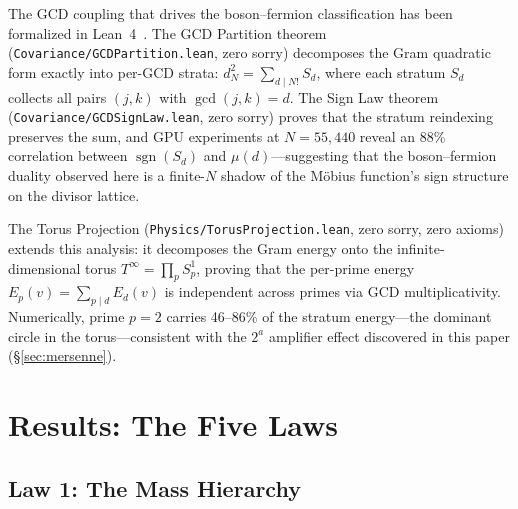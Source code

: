 \documentclass[11pt,a4paper]{article}
\begin{document}
\begin{remark}
The GCD coupling that drives the boson--fermion classification has been
formalized in Lean~4~\cite{cathedral-physics}. The GCD Partition theorem
(\texttt{Covariance/GCDPartition.lean}, zero sorry) decomposes the
Gram quadratic form exactly into per-GCD strata:
$d_N^2 = \sum_{d \mid N!} S_d$,
where each stratum $S_d$ collects all pairs $(j,k)$ with $\gcd(j,k) = d$.
The Sign Law theorem (\texttt{Covariance/GCDSignLaw.lean}, zero sorry)
proves that the stratum reindexing preserves the sum, and GPU experiments
at $N = 55{,}440$ reveal an 88\% correlation between
$\operatorname{sgn}(S_d)$ and $\mu(d)$---suggesting that the
boson--fermion duality observed here is a finite-$N$ shadow of the
M\"obius function's sign structure on the divisor lattice.

The Torus Projection (\texttt{Physics/TorusProjection.lean}, zero sorry,
zero axioms) extends this analysis: it decomposes the Gram energy onto
the infinite-dimensional torus $T^\infty = \prod_p S^1_p$, proving
that the per-prime energy $E_p(v) = \sum_{p \mid d} E_d(v)$ is
independent across primes via GCD multiplicativity. Numerically,
prime $p = 2$ carries 46--86\% of the stratum energy---the dominant
circle in the torus---consistent with the $2^a$ amplifier effect
discovered in this paper (\S\ref{sec:mersenne}).
\end{remark}

\section{Results: The Five Laws}
\label{sec:results}

\subsection{Law 1: The Mass Hierarchy}
\end{document}
